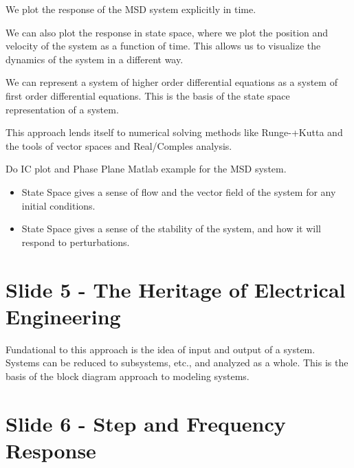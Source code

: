 \documentclass[
  letterpaper,
  DIV=11,
  numbers=noendperiod]{scrreprt}
\providecommand{\tightlist}{%
  \setlength{\itemsep}{0pt}\setlength{\parskip}{0pt}}
\begin{document}
We plot the response of the MSD system explicitly in time.

We can also plot the response in state space, where we plot the position
and velocity of the system as a function of time. This allows us to
visualize the dynamics of the system in a different way.

We can represent a system of higher order differential equations as a
system of first order differential equations. This is the basis of the
state space representation of a system.

This approach lends itself to numerical solving methods like
Runge-+Kutta and the tools of vector spaces and Real/Comples analysis.

\begin{tcolorbox}[enhanced jigsaw, arc=.35mm, bottomrule=.15mm, bottomtitle=1mm, breakable, colback=white, colbacktitle=quarto-callout-note-color!10!white, colframe=quarto-callout-note-color-frame, coltitle=black, left=2mm, leftrule=.75mm, opacityback=0, opacitybacktitle=0.6, rightrule=.15mm, title=\textcolor{quarto-callout-note-color}{\faInfo}\hspace{0.5em}{Note}, titlerule=0mm, toprule=.15mm, toptitle=1mm]

Do IC plot and Phase Plane Matlab example for the MSD system.

\end{tcolorbox}

\begin{itemize}
\tightlist
\item
  State Space gives a sense of flow and the vector field of the system
  for any initial conditions.
\item
  State Space gives a sense of the stability of the system, and how it
  will respond to perturbations.
\end{itemize}

\section{Slide 5 - The Heritage of Electrical
Engineering}\label{slide-5---the-heritage-of-electrical-engineering}

Fundational to this approach is the idea of input and output of a
system. Systems can be reduced to subsystems, etc., and analyzed as a
whole. This is the basis of the block diagram approach to modeling
systems.

\section{Slide 6 - Step and Frequency
Response}\label{slide-6---step-and-frequency-response}
\end{document}
